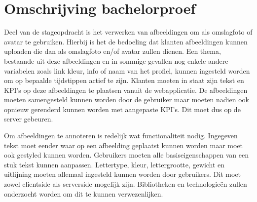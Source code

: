 \chapter{Omschrijving bachelorproef}
\vspace{-3cm}
Deel van de stageopdracht is het verwerken van afbeeldingen om als omslagfoto of avatar te gebruiken. Hierbij is het de bedoeling dat klanten afbeeldingen kunnen uploaden die dan als omslagfoto en/of avatar zullen dienen.  Een thema, bestaande uit deze afbeeldingen en in sommige gevallen nog enkele andere variabelen zoals link kleur, info of naam van het profiel, kunnen ingesteld worden om op bepaalde tijdstippen actief te zijn. Klanten moeten in staat zijn tekst en KPI's op deze afbeeldingen te plaatsen vanuit de webapplicatie. De afbeeldingen moeten samengesteld kunnen worden door de gebruiker maar moeten nadien ook opnieuw gerenderd kunnen worden met aangepaste KPI's. Dit moet dus op de server gebeuren. 

Om afbeeldingen te annoteren is redelijk wat functionaliteit nodig. Ingegeven tekst moet eender waar op een afbeelding geplaatst kunnen worden maar moet ook gestyled kunnen worden. Gebruikers moeten alle basiseigenschappen van een stuk tekst kunnen aanpassen. Lettertype, kleur, lettergrootte, gewicht en uitlijning moeten allemaal ingesteld kunnen worden door gebruikers. Dit moet zowel clientside als serverside mogelijk zijn. Bibliotheken en technologie\"{e}n zullen onderzocht worden om dit te kunnen verwezenlijken.
\fi  


